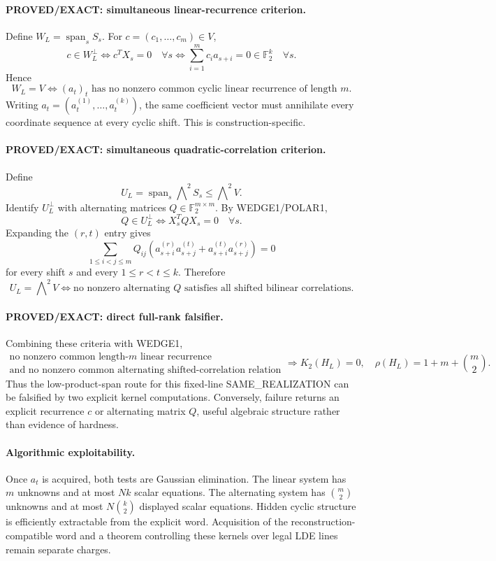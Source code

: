 \documentclass[11pt]{article}
\begin{document}
\paragraph{PROVED/EXACT: simultaneous linear-recurrence criterion.}
Define \(W_L=\operatorname{span}_{s}S_s\). For \(c=(c_1,\ldots,c_m)\in V\),
\[
c\in W_L^\perp
\iff c^TX_s=0\quad\forall s
\iff
\boxed{\sum_{i=1}^{m}c_i a_{s+i}=0\in\mathbb F_2^k\quad\forall s.}
\]
Hence
\[
\boxed{W_L=V\iff (a_t)_t\text{ has no nonzero common cyclic linear recurrence of length }m.}
\]
Writing \(a_t=(a_t^{(1)},\ldots,a_t^{(k)})\), the same coefficient vector must annihilate every coordinate sequence at every cyclic shift. This is construction-specific.

\paragraph{PROVED/EXACT: simultaneous quadratic-correlation criterion.}
Define
\[
U_L=\operatorname{span}_{s}\bigwedge\nolimits^2S_s\le\bigwedge\nolimits^2V.
\]
Identify \(U_L^\perp\) with alternating matrices \(Q\in\mathbb F_2^{m\times m}\). By WEDGE1/POLAR1,
\[
Q\in U_L^\perp\iff X_s^TQX_s=0\quad\forall s.
\]
Expanding the \((r,t)\) entry gives
\[
\boxed{
\sum_{1\le i<j\le m}Q_{ij}
\left(a_{s+i}^{(r)}a_{s+j}^{(t)}+a_{s+i}^{(t)}a_{s+j}^{(r)}\right)=0
}
\]
for every shift \(s\) and every \(1\le r<t\le k\). Therefore
\[
\boxed{
U_L=\bigwedge\nolimits^2V
\iff
\text{no nonzero alternating }Q\text{ satisfies all shifted bilinear correlations.}
}
\]

\paragraph{PROVED/EXACT: direct full-rank falsifier.}
Combining these criteria with WEDGE1,
\[
\boxed{
\begin{array}{c}
\text{no nonzero common length-}m\text{ linear recurrence}\\
\text{and no nonzero common alternating shifted-correlation relation}
\end{array}
\Longrightarrow K_2(H_L)=0,\quad \rho(H_L)=1+m+\binom m2.
}
\]
Thus the low-product-span route for this fixed-line SAME\_REALIZATION can be falsified by two explicit kernel computations. Conversely, failure returns an explicit recurrence \(c\) or alternating matrix \(Q\), useful algebraic structure rather than evidence of hardness.

\paragraph{Algorithmic exploitability.}
Once \(a_t\) is acquired, both tests are Gaussian elimination. The linear system has \(m\) unknowns and at most \(Nk\) scalar equations. The alternating system has \(\binom m2\) unknowns and at most \(N\binom k2\) displayed scalar equations. Hidden cyclic structure is efficiently extractable from the explicit word. Acquisition of the reconstruction-compatible word and a theorem controlling these kernels over legal LDE lines remain separate charges.
\end{document}
